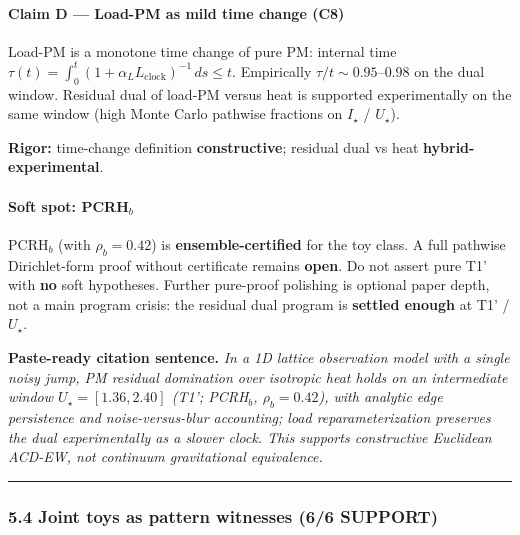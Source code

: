 \documentclass[
  11pt,
]{article}
\begin{document}
\paragraph{\texorpdfstring{Claim D --- Load-PM as mild time change (\textbf{C8})}{Claim D --- Load-PM as mild time change (C8)}}\label{claim-d-load-pm-as-mild-time-change-c8}

Load-PM is a monotone time change of pure PM: internal time \(\tau(t)=\int_0^t(1+\alpha_L L_{\mathrm{clock}})^{-1}\,ds\le t\). Empirically \(\tau/t\sim 0.95\)--\(0.98\) on the dual window. Residual dual of load-PM versus heat is supported experimentally on the same window (high Monte Carlo pathwise fractions on \(I_\star\) / \(U_\star\)).

\textbf{Rigor:} time-change definition \textbf{constructive}; residual dual vs heat \textbf{hybrid-experimental}.

\paragraph{\texorpdfstring{Soft spot: PCRH\(_b\)}{Soft spot: PCRH\_b}}\label{soft-spot-pcrh_b}

PCRH\(_b\) (with \(\rho_b=0.42\)) is \textbf{ensemble-certified} for the toy class. A full pathwise Dirichlet-form proof without certificate remains \textbf{open}. Do not assert pure T1' with \textbf{no} soft hypotheses. Further pure-proof polishing is optional paper depth, not a main program crisis: the residual dual program is \textbf{settled enough} at T1' / \(U_\star\).

\textbf{Paste-ready citation sentence.} \emph{In a 1D lattice observation model with a single noisy jump, PM residual domination over isotropic heat holds on an intermediate window \(U_\star=[1.36,2.40]\) (T1'; PCRH\(_b\), \(\rho_b=0.42\)), with analytic edge persistence and noise-versus-blur accounting; load reparameterization preserves the dual experimentally as a slower clock. This supports constructive Euclidean ACD-EW, not continuum gravitational equivalence.}

\begin{center}\rule{0.5\linewidth}{0.5pt}\end{center}

\subsubsection{5.4 Joint toys as pattern witnesses (6/6 SUPPORT)}\label{joint-toys-as-pattern-witnesses-66-support}
\end{document}
